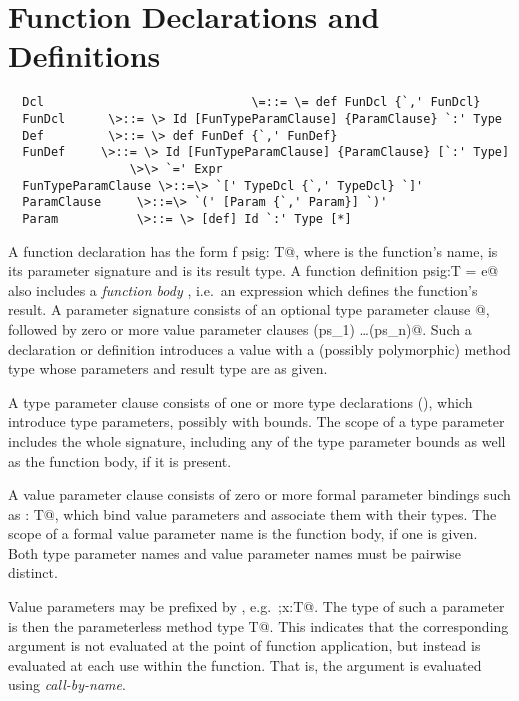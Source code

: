 \documentclass[11pt]{report}
\begin{document}
\section{Function Declarations and Definitions}
\label{sec:defdef}
\label{sec:funsigs}

\syntax\begin{verbatim}
  Dcl                             \=::= \= def FunDcl {`,' FunDcl}
  FunDcl      \>::= \> Id [FunTypeParamClause] {ParamClause} `:' Type
  Def         \>::= \> def FunDef {`,' FunDef}
  FunDef     \>::= \> Id [FunTypeParamClause] {ParamClause} [`:' Type] 
                 \>\> `=' Expr
  FunTypeParamClause \>::=\> `[' TypeDcl {`,' TypeDcl} `]'
  ParamClause     \>::=\> `(' [Param {`,' Param}] `)'
  Param        	  \>::= \> [def] Id `:' Type [*]
\end{verbatim}

A function declaration has the form \verb@def f psig: T@, where
\verb@f@ is the function's name, \verb@psig@ is its parameter
signature and \verb@T@ is its result type. A function definition
\verb@f psig:T = e@ also includes a {\em function body} \verb@e@,
i.e.\ an expression which defines the function's result.  A parameter
signature consists of an optional type parameter clause \verb@[tps]@,
followed by zero or more value parameter clauses
\verb@(ps_1) \ldots (ps_n)@.  Such a declaration or definition
introduces a value with a (possibly polymorphic) method type whose
parameters and result type are as given.

A type parameter clause \verb@tps@ consists of one or more type
declarations (), which introduce type parameters,
possibly with bounds.  The scope of a type parameter \verb@a@ includes
the whole signature, including any of the type parameter bounds as
well as the function body, if it is present.  

A value parameter clause \verb@ps@ consists of zero or more formal
parameter bindings such as \verb@x: T@, which bind value
parameters and associate them with their types.  The scope of a formal
value parameter name \verb@x@ is the function body, if one is
given. Both type parameter names and value parameter names must be
pairwise distinct.

Value parameters may be prefixed by \verb@def@, e.g.\
\verb@\DEF;x:T@. The type of such a parameter is then the
parameterless method type \verb@[]T@. This indicates that the
corresponding argument is not evaluated at the point of function
application, but instead is evaluated at each use within the
function. That is, the argument is evaluated using {\em call-by-name}.
\end{document}
